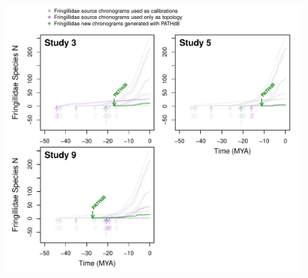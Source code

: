 \documentclass[]{article}
\begin{document}
\newpage

\begin{figure}[!h]
\includegraphics{fig_crossval_boldsumm.pdf}
\caption{}
\label{fig:cvbold}
\end{figure}
\end{document}
